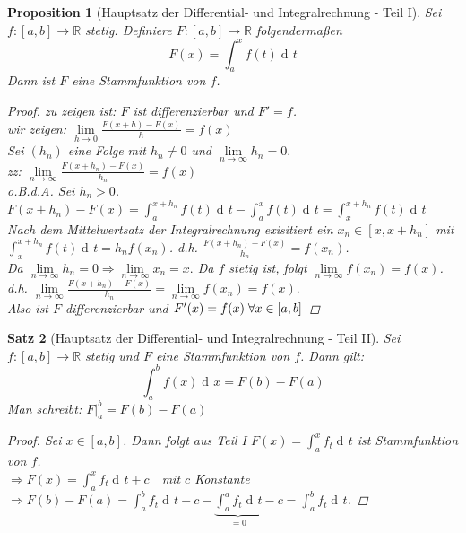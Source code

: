 \documentclass[a4paper,titlepage,oneside]{article}
\def\R{\ensuremath{\mathbb{R}} }
\newcommand{\der}{\operatorname{d\!}{}}
\def\sp{\hspace{0,1cm}}
\renewcommand{\liminf}[2][n]{\ensuremath{\lim\limits_{#1 \rightarrow \infty}{#2}}}
\newcommand{\limnull}[2][n]{\ensuremath{\lim\limits_{#1 \rightarrow 0}{#2}}}
\newcommand{\integral}[4][x]{\ensuremath{\int_{#2}^{#3}{#4\der #1}}}
\newcommand{\intAB}[2][x]{\integral[#1]{a}{b}{#2}}
\theoremstyle{thmstyle}
\newtheorem{satz}{Satz}[section]
\newtheorem{prop}[satz]{Proposition}
\theoremstyle{subthmstyle}
\begin{document}
\begin{prop}[Hauptsatz der Differential- und Integralrechnung - Teil I]
Sei $f: [a,b] \to \R$ stetig. Definiere $F: [a,b] \to \R$ folgendermaßen
\[F(x) = \int_{a}^{x}{f(t)\der t}\]
Dann ist $F$ eine Stammfunktion von $f$.
\begin{proof}
zu zeigen ist: $F$ ist differenzierbar und $F' = f$.\\
wir zeigen: $\limnull[h]{\frac{F(x+h) - F(x)}{h}} = f(x)$\\
Sei $(h_n)$ eine Folge mit $h_n \ne 0$ und $\liminf{h_n} = 0.$\\
zz: $ \liminf{\frac{F(x+h_n) - F(x)}{h_n}} = f(x)$\\
o.B.d.A. Sei $h_n > 0$.\\
$F(x+h_n) - F(x) = \int_{a}^{x+h_n}{f(t)\der t} - \int_{a}^{x}{f(t)\der t} = \int_{x}^{x+h_n}{f(t)\der t}$\\
Nach dem Mittelwertsatz der Integralrechnung exisitiert ein $x_n \in [x, x+ h_n]$ mit $\int_{x}^{x+h_n}{f(t)\der t} = h_n f(x_n)$.
d.h. $\frac{F(x+h_n) - F(x)}{h_n} = f(x_n)$.\\
Da $ \liminf{h_n} = 0 \Rightarrow \liminf{x_n} = x.$ Da $f$ stetig ist, folgt $\liminf{f(x_n)} = f(x)$. d.h. $\liminf{\frac{F(x+h_n) - F(x)}{h_n}} = \liminf{f(x_n)} = f(x).$\\
Also ist $F$ differenzierbar und $F'(x) = f(x) \sp \forall x \in [a,b]$
\end{proof}
\end{prop}

\begin{satz}[Hauptsatz der Differential- und Integralrechnung - Teil II]
Sei $f: [a,b] \to \R$ stetig und $F$ eine Stammfunktion von $f$. Dann gilt: \[ \intAB{f(x)} = F(b) - F(a)\]
Man schreibt: $F|_a^b = F(b) - F(a)$
\begin{proof}
Sei $x \in [a,b]$. Dann folgt aus Teil I $\displaystyle F(x) = \int_{a}^{x}{f_t \der t}$ ist Stammfunktion von $f$.\\
$\displaystyle\Rightarrow F(x) = \int_{a}^{x}{f_t \der t} + c \quad $mit $c$ Konstante\\
$\displaystyle\Rightarrow F(b) - F(a) = \int_{a}^{b}{f_t \der t} + c - \underbrace{\int_{a}^{a}{f_t \der t}}_{= 0} - c = \int_{a}^{b}{f_t \der t}$.
\end{proof}
\end{satz}
\end{document}
